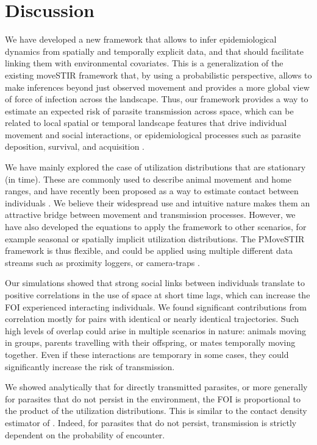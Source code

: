 \documentclass[letterpaper]{article}
\begin{document}
\section*{Discussion}
We have developed a new framework that allows to infer epidemiological dynamics from spatially and temporally explicit data, and that should facilitate linking them with environmental covariates. This is a generalization of the existing moveSTIR framework \citep{Wilber2022} that, by using a probabilistic perspective, allows to make inferences beyond just observed movement and provides a more global view of force of infection across the landscape. 
Thus, our framework provides a way to estimate an expected risk of parasite transmission across space, which can be related to local spatial or temporal landscape features that drive individual movement and social interactions, or epidemiological processes such as parasite deposition, survival, and acquisition \citep{Merkle2018,VanderWaal2017}. 

We have mainly explored the case of utilization distributions that are stationary (in time). These are commonly used to describe animal movement and home ranges, and have recently been proposed as a way to estimate contact between individuals \citep{Noonan2021}. 
We believe their widespread use and intuitive nature makes them an attractive bridge between movement and transmission processes. 
However, we have also developed the equations to apply the framework to other scenarios, for example seasonal or spatially implicit utilization distributions. 
The PMoveSTIR framework is thus flexible, and could be applied using multiple different data streams such as proximity loggers, or camera-traps \citep{Wilber2022}.

Our simulations showed that strong social links between individuals translate to positive correlations  in the use of space at short time lags, which can increase the FOI experienced interacting individuals. 
We found significant contributions from correlation mostly for pairs with identical or nearly identical trajectories. Such high levels of overlap could arise in multiple scenarios in nature: animals moving in groups, parents travelling with their offspring, or mates temporally moving together. Even if these interactions are temporary in some cases, they could significantly increase the risk of transmission. 

We showed analytically that for directly transmitted parasites, or more generally for parasites that do not persist in the environment, the FOI is proportional to the product of the utilization distributions. This is similar to the contact density estimator of \citet{Noonan2021}. Indeed, for parasites that do not persist, transmission is strictly dependent on the probability of encounter.
\end{document}
